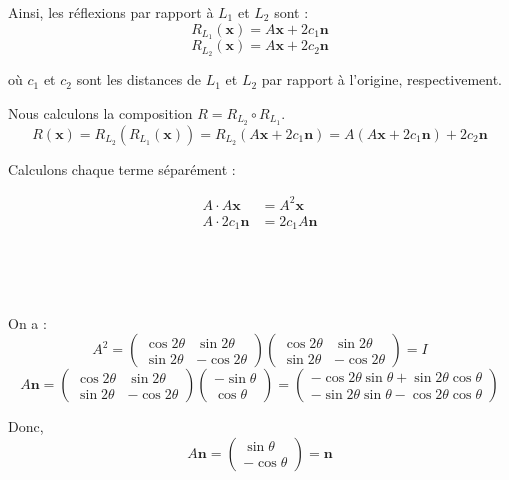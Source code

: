 Ainsi, les r{\'e}flexions par rapport {\`a} $L_1$ et $L_2$ sont :
\[ R_{L_1} (\mathbf{x}) = A \mathbf{x} + 2 c_1 \mathbf{n} \]
\[ R_{L_2} (\mathbf{x}) = A \mathbf{x} + 2 c_2 \mathbf{n} \]


o{\`u} $c_1$ et $c_2$ sont les distances de $L_1$ et $L_2$ par rapport {\`a}
l'origine, respectivement.

Nous calculons la composition $R = R_{L_2} \circ R_{L_1}$.
\[ R (\mathbf{x}) = R_{L_2} (R_{L_1} (\mathbf{x})) = R_{L_2} (A \mathbf{x} + 2
   c_1 \mathbf{n}) = A (A \mathbf{x} + 2 c_1 \mathbf{n}) + 2 c_2 \mathbf{n} \]


Calculons chaque terme s{\'e}par{\'e}ment :

\begin{align*}
  A \cdot A \mathbf{x} & = A^2 \mathbf{x}\\
  A \cdot 2 c_1 \mathbf{n} & = 2 c_1 A \mathbf{n}
\end{align*}

\

\

On a :
\[ A^2 = \left(\begin{array}{cc}
     \cos 2 \theta & \sin 2 \theta\\
     \sin 2 \theta & - \cos 2 \theta
   \end{array}\right) \left(\begin{array}{cc}
     \cos 2 \theta & \sin 2 \theta\\
     \sin 2 \theta & - \cos 2 \theta
   \end{array}\right) = I \]
\[ A \mathbf{n} = \left(\begin{array}{cc}
     \cos 2 \theta & \sin 2 \theta\\
     \sin 2 \theta & - \cos 2 \theta
   \end{array}\right) \left(\begin{array}{c}
     - \sin \theta\\
     \cos \theta
   \end{array}\right) = \left(\begin{array}{c}
     - \cos 2 \theta \sin \theta + \sin 2 \theta \cos \theta\\
     - \sin 2 \theta \sin \theta - \cos 2 \theta \cos \theta
   \end{array}\right) \]


Donc,
\[ A \mathbf{n} = \left(\begin{array}{c}
     \sin \theta\\
     - \cos \theta
   \end{array}\right) = \mathbf{n} \]


